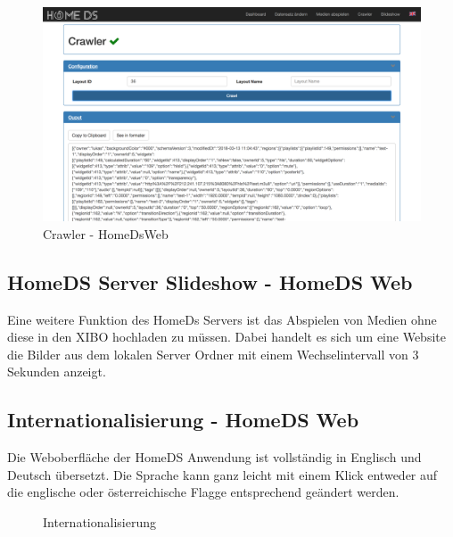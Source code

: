 \begin{figure}[H]
\centering
\includegraphics[width=1\textwidth]{images/08_HomeDsWeb/Crawler.png}
\caption{Crawler - HomeDsWeb}
\label{img:crawler}
\end{figure}

\subsection{HomeDS Server Slideshow - HomeDS Web}\label{sec:homedsslideshow}
Eine weitere Funktion des HomeDs Servers ist das Abspielen von Medien ohne diese in den XIBO hochladen zu müssen. Dabei handelt es sich um eine Website die Bilder aus dem lokalen Server Ordner mit einem Wechselintervall von 3 Sekunden anzeigt. 

\subsection{Internationalisierung - HomeDS Web}\label{sec:i18n}
Die Weboberfläche der HomeDS Anwendung ist vollständig in Englisch und Deutsch übersetzt. Die Sprache kann ganz leicht mit einem Klick entweder auf die englische oder österreichische Flagge entsprechend geändert werden.

\begin{figure}[H]
    \centering
    \qquad
    \caption{Internationalisierung}
    \label{img:flags}
\end{figure}

